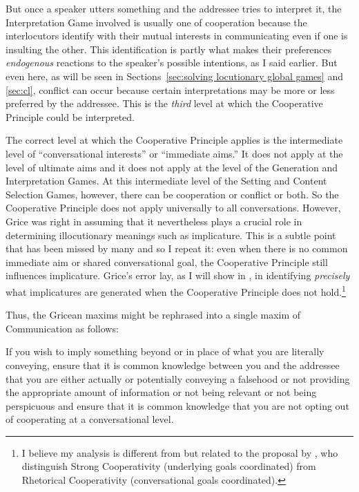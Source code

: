 But once a speaker utters something and the addressee tries to interpret it, the Interpretation Game involved is usually one of cooperation because the interlocutors identify with their mutual interests in communicating even if one is insulting the other. This identification is partly what makes their preferences \emph{endogenous} reactions to the speaker's possible intentions, as I said earlier. But even here, as will be seen in Sections~\ref{sec:solving locutionary global games} and \ref{sec:cl}, conflict can occur because certain interpretations may be more or less preferred by the addressee. This is the \emph{third} level at which the Cooperative Principle could be interpreted.

The correct level at which the Cooperative Principle applies is the intermediate level of ``conversational interests'' or ``immediate aims.'' It does not apply at the level of ultimate aims and it does not apply at the level of the Generation and Interpretation Games. At this intermediate level of the Setting and Content Selection Games, however, there can be cooperation or conflict or both. So the Cooperative Principle does not apply universally to all conversations. However, Grice was right in assuming that it nevertheless plays a crucial role in determining illocutionary meanings such as implicature. This is a subtle point that has been missed by many and so I repeat it: even when there is no common immediate aim or shared conversational goal, the Cooperative Principle still influences implicature. Grice's error lay, as I will show in , in identifying \emph{precisely} what implicatures are generated when the Cooperative Principle does not hold.\footnote{I believe my analysis is different from but related to the proposal by \citet{al:lc}, who distinguish Strong Cooperativity (underlying goals coordinated) from Rhetorical Cooperativity (conversational goals coordinated).}

Thus, the Gricean maxims might be rephrased into a single maxim of Communication as follows:

\begin{description}[wide=0pt]
\item[The maxim of Communication:] If you wish to imply something beyond or in place of what you are literally conveying, ensure that it is common knowledge between you and the addressee that you are either actually or potentially conveying a falsehood or not providing the appropriate amount of information or not being relevant or not being perspicuous and ensure that it is common knowledge that you are not opting out of cooperating at a conversational level.
\end{description}

